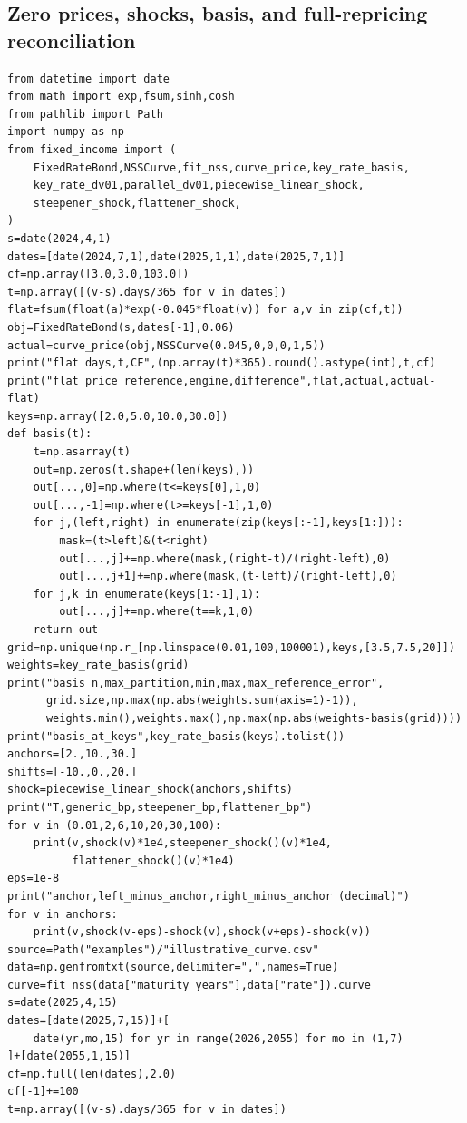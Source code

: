 \documentclass[12pt,a4paper]{article}
\begin{document}
\subsection{Zero prices, shocks, basis, and full-repricing reconciliation}
\begingroup\scriptsize
\begin{verbatim}
from datetime import date
from math import exp,fsum,sinh,cosh
from pathlib import Path
import numpy as np
from fixed_income import (
    FixedRateBond,NSSCurve,fit_nss,curve_price,key_rate_basis,
    key_rate_dv01,parallel_dv01,piecewise_linear_shock,
    steepener_shock,flattener_shock,
)
s=date(2024,4,1)
dates=[date(2024,7,1),date(2025,1,1),date(2025,7,1)]
cf=np.array([3.0,3.0,103.0])
t=np.array([(v-s).days/365 for v in dates])
flat=fsum(float(a)*exp(-0.045*float(v)) for a,v in zip(cf,t))
obj=FixedRateBond(s,dates[-1],0.06)
actual=curve_price(obj,NSSCurve(0.045,0,0,0,1,5))
print("flat days,t,CF",(np.array(t)*365).round().astype(int),t,cf)
print("flat price reference,engine,difference",flat,actual,actual-flat)
keys=np.array([2.0,5.0,10.0,30.0])
def basis(t):
    t=np.asarray(t)
    out=np.zeros(t.shape+(len(keys),))
    out[...,0]=np.where(t<=keys[0],1,0)
    out[...,-1]=np.where(t>=keys[-1],1,0)
    for j,(left,right) in enumerate(zip(keys[:-1],keys[1:])):
        mask=(t>left)&(t<right)
        out[...,j]+=np.where(mask,(right-t)/(right-left),0)
        out[...,j+1]+=np.where(mask,(t-left)/(right-left),0)
    for j,k in enumerate(keys[1:-1],1):
        out[...,j]+=np.where(t==k,1,0)
    return out
grid=np.unique(np.r_[np.linspace(0.01,100,100001),keys,[3.5,7.5,20]])
weights=key_rate_basis(grid)
print("basis n,max_partition,min,max,max_reference_error",
      grid.size,np.max(np.abs(weights.sum(axis=1)-1)),
      weights.min(),weights.max(),np.max(np.abs(weights-basis(grid))))
print("basis_at_keys",key_rate_basis(keys).tolist())
anchors=[2.,10.,30.]
shifts=[-10.,0.,20.]
shock=piecewise_linear_shock(anchors,shifts)
print("T,generic_bp,steepener_bp,flattener_bp")
for v in (0.01,2,6,10,20,30,100):
    print(v,shock(v)*1e4,steepener_shock()(v)*1e4,
          flattener_shock()(v)*1e4)
eps=1e-8
print("anchor,left_minus_anchor,right_minus_anchor (decimal)")
for v in anchors:
    print(v,shock(v-eps)-shock(v),shock(v+eps)-shock(v))
source=Path("examples")/"illustrative_curve.csv"
data=np.genfromtxt(source,delimiter=",",names=True)
curve=fit_nss(data["maturity_years"],data["rate"]).curve
s=date(2025,4,15)
dates=[date(2025,7,15)]+[
    date(yr,mo,15) for yr in range(2026,2055) for mo in (1,7)
]+[date(2055,1,15)]
cf=np.full(len(dates),2.0)
cf[-1]+=100
t=np.array([(v-s).days/365 for v in dates])

\end{verbatim}
\end{document}
